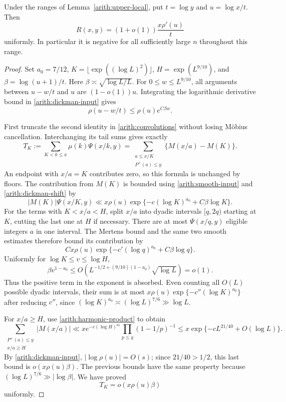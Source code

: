 \begin{lemma}\label{arith:bridge}
Under the ranges of Lemma~\ref{arith:upper-local}, put
$t=\log y$ and $u=\log x/t$. Then
\begin{equation}\label{arith:rough-asymptotic}
 R(x,y)=(1+o(1))\frac{x\rho'(u)}t
\end{equation}
uniformly. In particular it is negative for all sufficiently large $n$
throughout this range.
\end{lemma}
\begin{proof}
Set $a_0=7/12$, $K=\lfloor\exp((\log L)^2)\rfloor$,
$H=\exp(L^{9/10})$, and $\beta=\log(u+1)/t$.
Here $\beta\asymp\sqrt{\log L/L}$. For $0\le w\le L^{9/10}$,
all arguments between $u-w/t$ and $u$ are $(1-o(1))u$.
Integrating the logarithmic derivative bound in
\eqref{arith:dickman-input} gives
\begin{equation}\label{arith:dickman-shift}
 \rho(u-w/t)\le\rho(u)e^{C\beta w}.
\end{equation}

First truncate the second identity in \eqref{arith:convolutions} without
losing M\"obius cancellation. Interchanging its tail sums gives exactly
\begin{equation}\label{arith:tail-exact}
 T_K:=\sum_{K<k\le x}\mu(k)\Psi(x/k,y)
 =\sum_{\substack{a\le x/K\\P^+(a)\le y}}
       \{M(x/a)-M(K)\}.
\end{equation}
An endpoint with $x/a=K$ contributes zero, so this formula is unchanged by
floors. The contribution from $M(K)$ is bounded using
\eqref{arith:smooth-input} and \eqref{arith:dickman-shift} by
\[
 |M(K)|\Psi(x/K,y)
 \ll x\rho(u)\exp\{-c(\log K)^{a_0}+C\beta\log K\}.
\]
For the terms with $K<x/a<H$, split $x/a$ into dyadic intervals
$[q,2q)$ starting at $K$, cutting the last one at $H$ if necessary.
There are at most $\Psi(x/q,y)$ eligible integers $a$ in one interval.
The Mertens bound and the same two smooth estimates therefore bound its
contribution by
\[
 Cx\rho(u)\exp\{-c'(\log q)^{a_0}+C\beta\log q\}.
\]
Uniformly for $\log K\le v\le\log H$,
\[
 \beta v^{1-a_0}\le
 O\left(L^{-1/2+(9/10)(1-a_0)}\sqrt{\log L}\right)=o(1).
\]
Thus the positive term in the exponent is absorbed. Even counting all
$O(L)$ possible dyadic intervals, their sum is at most
$x\rho(u)\exp\{-c''(\log K)^{a_0}\}$ after reducing $c''$,
since $(\log K)^{a_0}\asymp(\log L)^{7/6}\gg\log L$.

For $x/a\ge H$, use \eqref{arith:harmonic-product} to obtain
\[
 \sum_{\substack{P^+(a)\le y\\x/a\ge H}}|M(x/a)|
 \ll x e^{-c(\log H)^{a_0}}
        \prod_{p\le y}(1-1/p)^{-1}
 \le x\exp\{-cL^{21/40}+O(\log L)\}.
\]
By \eqref{arith:dickman-input}, $|\log\rho(u)|=O(s)$; since
$21/40>1/2$, this last bound is $o(x\rho(u)\beta)$.
The previous bounds have the same property because
$(\log L)^{7/6}\gg|\log\beta|$. We have proved
\begin{equation}\label{arith:tail-small}
 T_K=o(x\rho(u)\beta)
\end{equation}
uniformly.


\end{proof}
